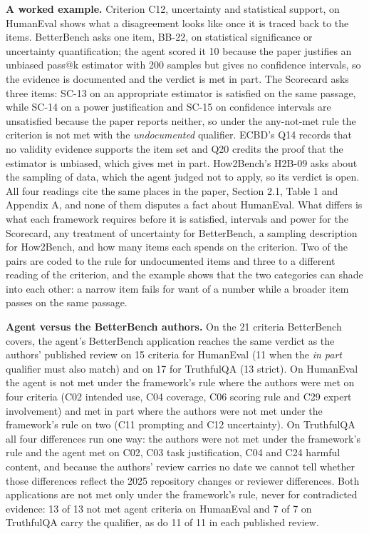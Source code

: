 \documentclass[10pt,conference]{IEEEtran}
\begin{document}
\textbf{A worked example.} Criterion C12, uncertainty and statistical support, on HumanEval shows what a disagreement looks like once it is traced back to the items. BetterBench asks one item, BB-22, on statistical significance or uncertainty quantification; the agent scored it 10 because the paper justifies an unbiased pass@k estimator with 200 samples but gives no confidence intervals, so the evidence is documented and the verdict is met in part. The Scorecard asks three items: SC-13 on an appropriate estimator is satisfied on the same passage, while SC-14 on a power justification and SC-15 on confidence intervals are unsatisfied because the paper reports neither, so under the any-not-met rule the criterion is not met with the \emph{undocumented} qualifier. ECBD's Q14 records that no validity evidence supports the item set and Q20 credits the proof that the estimator is unbiased, which gives met in part. How2Bench's H2B-09 asks about the sampling of data, which the agent judged not to apply, so its verdict is open. All four readings cite the same places in the paper, Section 2.1, Table 1 and Appendix A, and none of them disputes a fact about HumanEval. What differs is what each framework requires before it is satisfied, intervals and power for the Scorecard, any treatment of uncertainty for BetterBench, a sampling description for How2Bench, and how many items each spends on the criterion. Two of the pairs are coded to the rule for undocumented items and three to a different reading of the criterion, and the example shows that the two categories can shade into each other: a narrow item fails for want of a number while a broader item passes on the same passage.

\textbf{Agent versus the BetterBench authors.} On the 21 criteria BetterBench covers, the agent's BetterBench application reaches the same verdict as the authors' published review on 15 criteria for HumanEval (11 when the \emph{in part} qualifier must also match) and on 17 for TruthfulQA (13 strict). On HumanEval the agent is not met under the framework's rule where the authors were met on four criteria (C02 intended use, C04 coverage, C06 scoring rule and C29 expert involvement) and met in part where the authors were not met under the framework's rule on two (C11 prompting and C12 uncertainty). On TruthfulQA all four differences run one way: the authors were not met under the framework's rule and the agent met on C02, C03 task justification, C04 and C24 harmful content, and because the authors' review carries no date we cannot tell whether those differences reflect the 2025 repository changes or reviewer differences. Both applications are not met only under the framework's rule, never for contradicted evidence: 13 of 13 not met agent criteria on HumanEval and 7 of 7 on TruthfulQA carry the qualifier, as do 11 of 11 in each published review.
\end{document}
